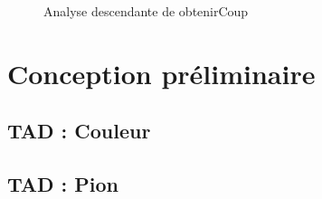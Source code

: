 \documentclass{article}
\begin{document}
\begin{figure}[H]                                                                                                                                                                                             
    \caption{Analyse descendante de obtenirCoup}                                                                                                                          
    \label{un-identifiant2}                                                                                                                                                                                 
\end{figure} 

\newpage      

\section{Conception préliminaire}

\subsection{TAD : Couleur}


\subsection{TAD : Pion}

\end{document}
